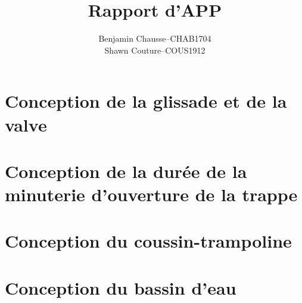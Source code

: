 \documentclass[a4paper]{article} \usepackage{tabularx}
\title{Rapport d'APP}
\author{
  \addtolength{\tabcolsep}{-0.4em}
  \begin{tabular}{rcl}
      Benjamin Chausse & -- & CHAB1704 \\
      Shawn Couture    & -- & COUS1912 \\
  \end{tabular}
}
\begin{document}
\maketitle
\contents{
\tableofcontents
\listoffigures
}

\section{Conception de la glissade et de la valve}




\section{Conception de la durée de la minuterie d’ouverture de la trappe}


\section{Conception du coussin-trampoline}


\section{Conception du bassin d’eau}



\end{document}
